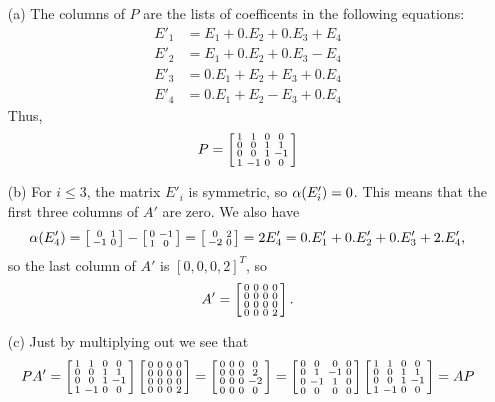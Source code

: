  \begin{itemize}
  \item[(a)] The columns of $P$ are the lists of coefficents
   in the following equations:
   \begin{align*}
    E'_1 &= E_1 + 0.E_2 + 0.E_3 + E_4 \\
    E'_2 &= E_1 + 0.E_2 + 0.E_3 - E_4 \\
    E'_3 &= 0.E_1 + E_2 + E_3 + 0.E_4 \\
    E'_4 &= 0.E_1 + E_2 - E_3 + 0.E_4
   \end{align*}
   Thus,
   {\tiny \[ P =
      \left[\begin{smallmatrix} 1&1&0&0 \\ 0&0&1&1 \\ 0&0&1&-1 \\ 1&-1&0&0 \end{smallmatrix}\right]
   \]}
  \item[(b)] For $i\leq 3$, the matrix $E'_i$ is symmetric,
   so $\alpha(E'_i)=0$.  This means that the first three
   columns of $A'$ are zero.  We also have
   \[ \alpha(E'_4) = \left[\begin{smallmatrix} 0&1\\-1&0\end{smallmatrix}\right] - \left[\begin{smallmatrix} 0&-1\\1&0\end{smallmatrix}\right] =
        \left[\begin{smallmatrix} 0&2\\-2&0 \end{smallmatrix}\right] = 2E'_4
        =0.E'_1+0.E'_2+0.E'_3+2.E'_4,
   \]
   so the last column of $A'$ is $[0,0,0,2]^T$, so
   {\tiny \[
    A' = \left[\begin{smallmatrix} 0&0&0&0 \\ 0&0&0&0 \\ 0&0&0&0 \\ 0&0&0&2 \end{smallmatrix}\right].
   \]}
  \item[(c)] Just by multiplying out we see that
   {\tiny \[
    PA' =
     \left[\begin{smallmatrix} 1&1&0&0 \\ 0&0&1&1 \\ 0&0&1&-1 \\ 1&-1&0&0 \end{smallmatrix}\right]
     \left[\begin{smallmatrix} 0&0&0&0 \\ 0&0&0&0 \\ 0&0&0&0 \\ 0&0&0&2 \end{smallmatrix}\right] =
     \left[\begin{smallmatrix} 0&0&0&0 \\ 0&0&0&2 \\ 0&0&0&-2 \\ 0&0&0&0 \end{smallmatrix}\right] =
     \left[\begin{smallmatrix} 0&0&0&0 \\ 0&1&-1&0 \\ 0&-1&1&0\\ 0&0&0&0 \end{smallmatrix}\right]
     \left[\begin{smallmatrix} 1&1&0&0 \\ 0&0&1&1 \\ 0&0&1&-1 \\ 1&-1&0&0 \end{smallmatrix}\right] =
    AP
   \]}
 \end{itemize}
\EndDeferredSolution

